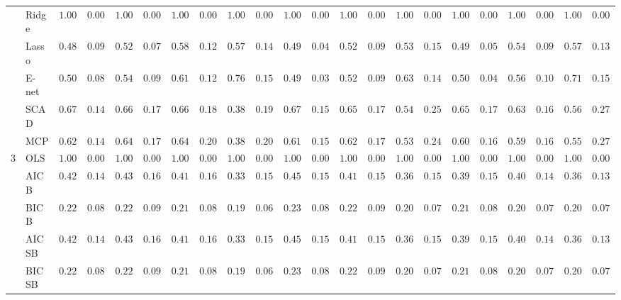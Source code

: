 \begin{tabular}{p{0.2cm}p{1cm}|p{0.6cm}p{0.6cm}|p{0.6cm}p{0.6cm}p{0.6cm}p{0.6cm}p{0.6cm}p{0.6cm}|p{0.6cm}p{0.6cm}p{0.6cm}p{0.6cm}p{0.6cm}p{0.6cm}|p{0.6cm}p{0.6cm}p{0.6cm}p{0.6cm}p{0.6cm}p{0.6cm}}
 & Ridge  & $1.0000$ & $0.0000$ & $1.0000$ & $0.0000$ & $1.0000$ & $0.0000$ & $1.0000$ & $0.0000$ & $1.0000$ & $0.0000$ & $1.0000$ & $0.0000$ & $1.0000$ & $0.0000$ & $1.0000$ & $0.0000$ & $1.0000$ & $0.0000$ & $1.0000$ & $0.0000$ \\
 & Lasso  & $0.4867$ & $0.0967$ & $0.5267$ & $0.0739$ & $0.5833$ & $0.1219$ & $0.5700$ & $0.1425$ & $0.4900$ & $0.0463$ & $0.5217$ & $0.0907$ & $0.5350$ & $0.1522$ & $0.4933$ & $0.0525$ & $0.5433$ & $0.0966$ & $0.5733$ & $0.1347$ \\
 & E-net  & $0.5017$ & $0.0837$ & $0.5467$ & $0.0920$ & $0.6183$ & $0.1238$ & $0.7600$ & $0.1577$ & $0.4983$ & $0.0374$ & $0.5267$ & $0.0939$ & $0.6383$ & $0.1480$ & $0.5000$ & $0.0474$ & $0.5600$ & $0.1099$ & $0.7100$ & $0.1528$ \\
 & SCAD  & $0.6783$ & $0.1484$ & $0.6617$ & $0.1732$ & $0.6667$ & $0.1880$ & $0.3800$ & $0.1955$ & $0.6717$ & $0.1507$ & $0.6583$ & $0.1747$ & $0.5417$ & $0.2577$ & $0.6567$ & $0.1722$ & $0.6350$ & $0.1653$ & $0.5633$ & $0.2770$ \\
 & MCP  & $0.6283$ & $0.1457$ & $0.6450$ & $0.1703$ & $0.6433$ & $0.2024$ & $0.3850$ & $0.2020$ & $0.6150$ & $0.1548$ & $0.6233$ & $0.1767$ & $0.5333$ & $0.2462$ & $0.6067$ & $0.1684$ & $0.5983$ & $0.1693$ & $0.5550$ & $0.2763$ \\\hline
3 & OLS  & $1.0000$ & $0.0000$ & $1.0000$ & $0.0000$ & $1.0000$ & $0.0000$ & $1.0000$ & $0.0000$ & $1.0000$ & $0.0000$ & $1.0000$ & $0.0000$ & $1.0000$ & $0.0000$ & $1.0000$ & $0.0000$ & $1.0000$ & $0.0000$ & $1.0000$ & $0.0000$ \\
 & AIC B  & $0.4233$ & $0.1449$ & $0.4333$ & $0.1692$ & $0.4100$ & $0.1648$ & $0.3367$ & $0.1589$ & $0.4500$ & $0.1562$ & $0.4133$ & $0.1598$ & $0.3633$ & $0.1560$ & $0.3900$ & $0.1539$ & $0.4033$ & $0.1444$ & $0.3600$ & $0.1355$ \\
 & BIC B  & $0.2200$ & $0.0816$ & $0.2233$ & $0.0954$ & $0.2150$ & $0.0896$ & $0.1983$ & $0.0699$ & $0.2367$ & $0.0860$ & $0.2217$ & $0.0919$ & $0.2017$ & $0.0760$ & $0.2117$ & $0.0882$ & $0.2050$ & $0.0744$ & $0.2000$ & $0.0749$ \\
 & AIC SB  & $0.4233$ & $0.1449$ & $0.4333$ & $0.1692$ & $0.4100$ & $0.1648$ & $0.3367$ & $0.1589$ & $0.4500$ & $0.1562$ & $0.4133$ & $0.1598$ & $0.3633$ & $0.1560$ & $0.3900$ & $0.1539$ & $0.4033$ & $0.1444$ & $0.3600$ & $0.1355$ \\
 & BIC SB  & $0.2200$ & $0.0816$ & $0.2233$ & $0.0954$ & $0.2150$ & $0.0896$ & $0.1983$ & $0.0699$ & $0.2367$ & $0.0860$ & $0.2250$ & $0.0929$ & $0.2017$ & $0.0760$ & $0.2117$ & $0.0882$ & $0.2050$ & $0.0744$ & $0.2000$ & $0.0749$ \\

\end{tabular}
